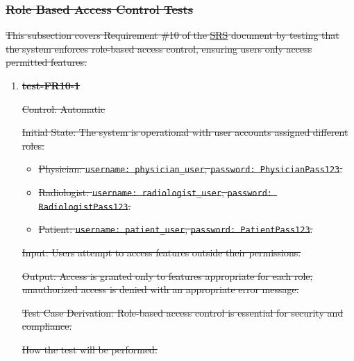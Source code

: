 \documentclass[12pt, titlepage]{article}
\begin{document}
\subsubsection{\sout{Role Based Access Control Tests}}

\sout{This subsection covers Requirement \#10 of the \href{https://github.com/RezaJodeiri/CXR-Capstone/blob/main/docs/SRS/SRS.pdf}{SRS} \citep{SRS}
document by testing that the system enforces role-based access control, ensuring users only access permitted features.}

\begin{enumerate}
\item \textbf{\sout{test-FR10-1}} \label{test-FR10-1}

\sout{Control: Automatic}

\sout{Initial State: The system is operational with user accounts assigned different roles:}
\begin{itemize}
  \item \sout{Physician: \texttt{username: physician\_user}, \texttt{password: PhysicianPass123}.}
  \item \sout{Radiologist: \texttt{username: radiologist\_user}, \texttt{password: RadiologistPass123}.}
  \item \sout{Patient: \texttt{username: patient\_user}, \texttt{password: PatientPass123}.}
\end{itemize}

\sout{Input: Users attempt to access features outside their permissions.}

\sout{Output: Access is granted only to features appropriate for each role; unauthorized access is denied with an appropriate error message.}

\sout{Test Case Derivation: Role-based access control is essential for security and compliance.}

\sout{How the test will be performed:}


\end{enumerate}
\end{document}

